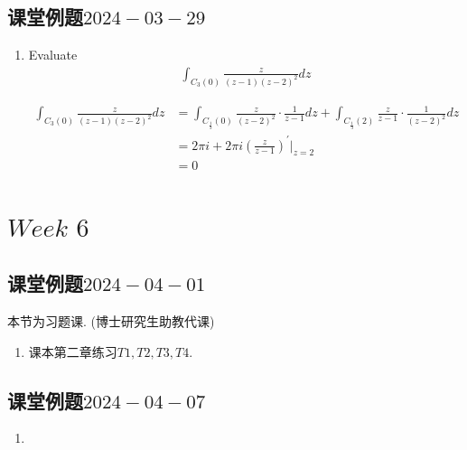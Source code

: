 \section{课堂例题$2024-03-29$}
	\begin{enumerate}
		\item Evaluate 
		\begin{align}
			\int_{C_{3}(0)}{\frac{z}{(z - 1)(z - 2)^2} dz}
		\end{align}
	
		\vspace{2em}
		\begin{solution}
			\begin{align}
				\int_{C_{3}(0)}{\frac{z}{(z - 1)(z - 2)^2} dz}
				&= \int_{C_{\frac{1}{3}}(0)}{\frac{z}{(z - 2)^2} \cdot \frac{1}{z - 1} dz} + \int_{C_{\frac{1}{3}}(2)}{\frac{z}{z - 1} \cdot \frac{1}{(z - 2)^2} dz} \\
				&= 2\pi i + 2\pi i \left( \frac{z}{z - 1} \right)^{'} \Big|_{z = 2} \\
				&= 0
			\end{align}
		\end{solution}
	\end{enumerate}

\chapter{$Week \,\, 6$}
\section{课堂例题$2024-04-01$}
	\begin{center}
		本节为习题课. (博士研究生助教代课)
	\end{center}
	\begin{enumerate}
		\item 课本第二章练习$T1 , T2 , T3 , T4$.
	\end{enumerate}

\newpage

\section{}







\newpage

\section{课堂例题$2024-04-07$}
	\begin{enumerate}
		\item 
	\end{enumerate}











	\ifx\allfiles\undefined

\fi